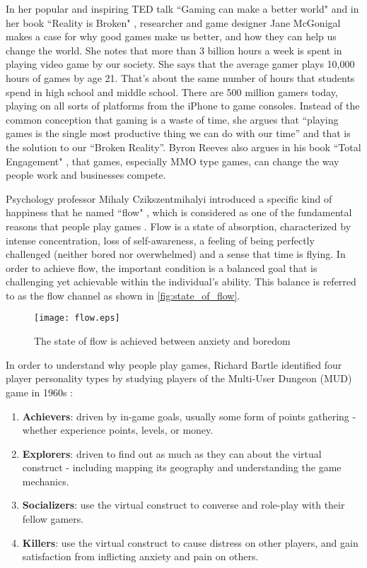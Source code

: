 In her popular and inspiring TED talk ``Gaming can make a better world" \cite {mcgonigal2010ted} and in her book ``Reality is Broken" \cite {mcgonigal2011reality}, researcher and game designer Jane McGonigal makes a case for why good games make us better, and how they can help us change the world. She notes that more than 3 billion hours a week is spent in playing video game by our society. She says that the average gamer plays 10,000 hours of games by age 21. That's about the same number of hours that students spend in high school and middle school. There are 500 million gamers today, playing on all sorts of platforms from the iPhone to game consoles. Instead of the common conception that gaming is a waste of time, she argues that ``playing games is the single most productive thing we can do with our time'' and that is  the solution to our ``Broken Reality''. Byron Reeves also argues in his book ``Total Engagement" \cite {reeves2009total}, that games, especially MMO type games, can change the way people work and businesses compete.

Psychology professor Mihaly Czikszentmihalyi introduced a specific kind of happiness that he named ``flow" \cite{csikszentmihalyi1991flow}, which is considered as one of the fundamental reasons that people play games \cite{murphygames}. Flow is a state of absorption, characterized by intense concentration, loss of self-awareness, a feeling of being perfectly challenged (neither bored nor overwhelmed) and a sense that time is flying. In order to achieve flow, the important condition is a balanced goal that is challenging yet achievable within the individual's ability. This balance is referred to as the flow channel as shown in \autoref{fig:state_of_flow}.

\begin{figure}[ht!]
	\centering
		\texttt{[image: flow.eps]}
		\caption{The state of flow is achieved between anxiety and boredom \cite{csikszentmihalyi1991flow}}
		\label{fig:state_of_flow}
\end{figure}

In order to understand why people play games, Richard Bartle identified four player personality types by studying players of the Multi-User Dungeon (MUD) game in 1960s \cite {bartle1996hearts}:
\begin{enumerate}
\item \textbf{Achievers}: driven by in-game goals, usually some form of points gathering - whether experience points, levels, or money.
\item \textbf{Explorers}:  driven to find out as much as they can about the virtual construct - including mapping its geography and understanding the game mechanics.
\item \textbf{Socializers}: use the virtual construct to converse and role-play with their fellow gamers.
\item \textbf{Killers}: use the virtual construct to cause distress on other players, and gain satisfaction from inflicting anxiety and pain on others.
\end{enumerate}

